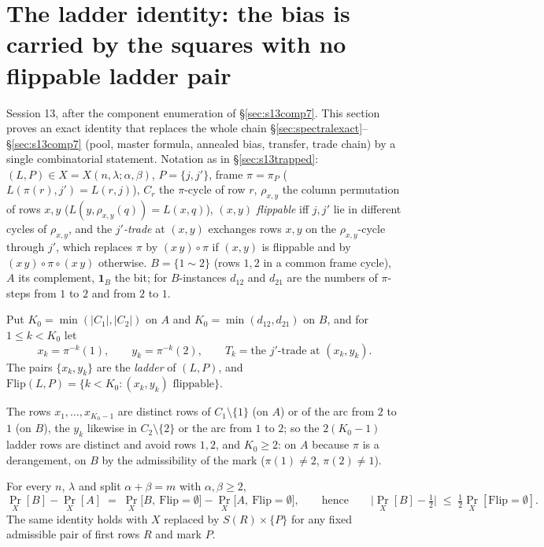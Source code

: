 \section{The ladder identity: the bias is carried by the squares with
no flippable ladder pair}\label{sec:ladder}

Session 13, after the component enumeration of \S\ref{sec:s13comp7}.
This section proves an exact identity that replaces the whole
chain \S\ref{sec:spectralexact}--\S\ref{sec:s13comp7} (pool, master
formula, annealed bias, transfer, trade chain) by a single
combinatorial statement.  Notation as in \S\ref{sec:s13trapped}:
$(L,P)\in X=X(n,\lambda;\alpha,\beta)$, $P=\{j,j'\}$, frame
$\pi=\pi_P$ ($L(\pi(r),j')=L(r,j)$), $C_r$ the $\pi$-cycle of row $r$,
$\rho_{x,y}$ the column permutation of rows $x,y$
($L(y,\rho_{x,y}(q))=L(x,q)$), $(x,y)$ \emph{flippable} iff $j,j'$ lie
in different cycles of $\rho_{x,y}$, and the \emph{$j'$-trade} at
$(x,y)$ exchanges rows $x,y$ on the $\rho_{x,y}$-cycle through $j'$,
which replaces $\pi$ by $(x\,y)\circ\pi$ if $(x,y)$ is flippable and by
$(x\,y)\circ\pi\circ(x\,y)$ otherwise.  $B=\{1\sim2\}$ (rows $1,2$ in a
common frame cycle), $A$ its complement, $\mathbf 1_B$ the bit; for $B$-instances $d_{12}$ and
$d_{21}$ are the numbers of $\pi$-steps from $1$ to $2$ and from $2$ to
$1$.

\begin{definition}[ladder]\label{def:ladder}
Put $K_0=\min(|C_1|,|C_2|)$ on $A$ and $K_0=\min(d_{12},d_{21})$ on
$B$, and for $1\le k<K_0$ let
\[
x_k=\pi^{-k}(1),\qquad y_k=\pi^{-k}(2),\qquad
T_k=\text{the $j'$-trade at }(x_k,y_k).
\]
The pairs $\{x_k,y_k\}$ are the \emph{ladder} of $(L,P)$, and
$\mathrm{Flip}(L,P)=\{k<K_0:(x_k,y_k)\text{ flippable}\}$.
\end{definition}

The rows $x_1,\dots,x_{K_0-1}$ are distinct rows of $C_1\setminus\{1\}$
(on $A$) or of the arc from $2$ to $1$ (on $B$), the $y_k$ likewise in
$C_2\setminus\{2\}$ or the arc from $1$ to $2$; so the $2(K_0-1)$
ladder rows are distinct and avoid rows $1,2$, and $K_0\ge2$: on $A$
because $\pi$ is a derangement, on $B$ by the admissibility of the mark
($\pi(1)\ne2$, $\pi(2)\ne1$).

\begin{theorem}\label{thm:ladder}
For every $n$, $\lambda$ and split $\alpha+\beta=m$ with
$\alpha,\beta\ge2$,
\[
\Pr_X[B]-\Pr_X[A]\;=\;\Pr_X\bigl[B,\ \mathrm{Flip}=\emptyset\bigr]
-\Pr_X\bigl[A,\ \mathrm{Flip}=\emptyset\bigr],
\qquad\text{hence}\qquad
\bigl|\Pr_X[B]-\tfrac12\bigr|\;\le\;\tfrac12\Pr_X[\mathrm{Flip}=\emptyset].
\]
The same identity holds with $X$ replaced by $S(R)\times\{P\}$ for any
fixed admissible pair of first rows $R$ and mark $P$.
\end{theorem}


